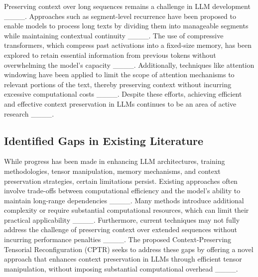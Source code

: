 Preserving context over long sequences remains a challenge in LLM development ____. Approaches such as segment-level recurrence have been proposed to enable models to process long texts by dividing them into manageable segments while maintaining contextual continuity ____. The use of compressive transformers, which compress past activations into a fixed-size memory, has been explored to retain essential information from previous tokens without overwhelming the model's capacity ____. Additionally, techniques like attention windowing have been applied to limit the scope of attention mechanisms to relevant portions of the text, thereby preserving context without incurring excessive computational costs ____. Despite these efforts, achieving efficient and effective context preservation in LLMs continues to be an area of active research ____.

\subsection{Identified Gaps in Existing Literature}

While progress has been made in enhancing LLM architectures, training methodologies, tensor manipulation, memory mechanisms, and context preservation strategies, certain limitations persist. Existing approaches often involve trade-offs between computational efficiency and the model's ability to maintain long-range dependencies ____. Many methods introduce additional complexity or require substantial computational resources, which can limit their practical applicability ____. Furthermore, current techniques may not fully address the challenge of preserving context over extended sequences without incurring performance penalties ____. The proposed Context-Preserving Tensorial Reconfiguration (CPTR) seeks to address these gaps by offering a novel approach that enhances context preservation in LLMs through efficient tensor manipulation, without imposing substantial computational overhead ____.